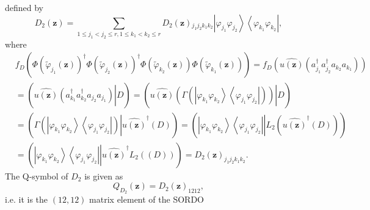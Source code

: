 \documentclass[aps,preprint]{revtex4}%
\begin{document}
defined by%
\begin{equation}
D_{2}\left(  \mathbf{z}\right)  =\sum_{1\leq j_{1}<j_{2}\leq r,1\leq
k_{1}<k_{2}\leq r}D_{2}\left(  \mathbf{z}\right)  {}_{j_{1}j_{2}k_{1}k_{2}%
}\left\vert \varphi_{j_{1}}\varphi_{j_{2}}\right\rangle \left\langle
\varphi_{k_{1}}\varphi_{k_{2}}\right\vert ,
\end{equation}
where%
\begin{align}
&  f_{D}\left(  \Phi\left(  \tilde{\varphi}_{j_{1}}\left(  \mathbf{z}\right)
\right)  ^{\dagger}\Phi\left(  \tilde{\varphi}_{j_{2}}\left(  \mathbf{z}%
\right)  \right)  ^{\dagger}\Phi\left(  \tilde{\varphi}_{k_{2}}\left(
\mathbf{z}\right)  \right)  \Phi\left(  \tilde{\varphi}_{k_{1}}\left(
\mathbf{z}\right)  \right)  \right)  =f_{D}\left(  \widehat{u\left(
\mathbf{z}\right)  }\left(  a_{j_{1}}^{\dagger}a_{j_{2}}^{\dagger}a_{k_{2}%
}a_{k_{1}}\right)  \right)  \nonumber\\
&  =\left(  \left.  \overset{}{\widehat{u\left(  \mathbf{z}\right)  }\left(
a_{k_{1}}^{\dagger}a_{k_{2}}^{\dagger}a_{j_{2}}a_{j_{1}}\right)  }\right\vert
D\right)  =\left(  \left.  \overset{}{\widehat{u\left(  \mathbf{z}\right)
}\left(  \Gamma\left(  \left\vert \varphi_{k_{1}}\varphi_{k_{2}}\right\rangle
\left\langle \varphi_{j_{1}}\varphi_{j_{2}}\right\vert \right)  \right)
}\right\vert D\right)  \nonumber\\
&  =\left(  \left.  \overset{}{\Gamma\left(  \left\vert \varphi_{k_{1}}%
\varphi_{k_{2}}\right\rangle \left\langle \varphi_{j_{1}}\varphi_{j_{2}%
}\right\vert \right)  }\right\vert \widehat{u\left(  \mathbf{z}\right)
}^{\dagger}\left(  D\right)  \right)  =\left(  \left.  \overset{}{\left\vert
\varphi_{k_{1}}\varphi_{k_{2}}\right\rangle \left\langle \varphi_{j_{1}%
}\varphi_{j_{2}}\right\vert }\right\vert L_{2}\left(  \widehat{u\left(
\mathbf{z}\right)  }^{\dagger}\left(  D\right)  \right)  \right)  \nonumber\\
&  =\left(  \left.  \overset{}{\left\vert \varphi_{k_{1}}\varphi_{k_{2}%
}\right\rangle \left\langle \varphi_{j_{1}}\varphi_{j_{2}}\right\vert
}\right\vert \widehat{u\left(  \mathbf{z}\right)  }^{\dagger}L_{2}\left(
\left(  D\right)  \right)  \right)  =D_{2}\left(  \mathbf{z}\right)
_{j_{1}j_{2}k_{1}k_{2}}.
\end{align}
The Q-symbol of $D_{2}$ is given as
\begin{equation}
Q_{D_{2}}\left(  \mathbf{z}\right)  =D_{2}\left(  \mathbf{z}\right)  _{1212},
\end{equation}
i.e. it is the $\left(  12,12\right)  $ matrix element of the SORDO
\end{document}
